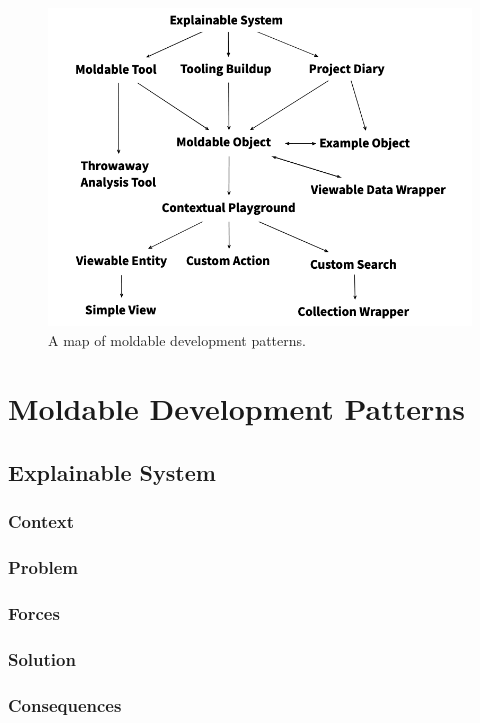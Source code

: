 \documentclass[sigconf]{acmart}
\begin{document}
\begin{figure}[h]
  \includegraphics[width=\columnwidth]{map}
  \caption{A map of moldable development patterns.}
  \label{fig:map}
\end{figure}


\section{Moldable Development Patterns}



\subsection{Explainable System}
\subsubsection*{Context}
\subsubsection*{Problem}
\subsubsection*{Forces}
\subsubsection*{Solution}
\subsubsection*{Consequences}
\end{document}

